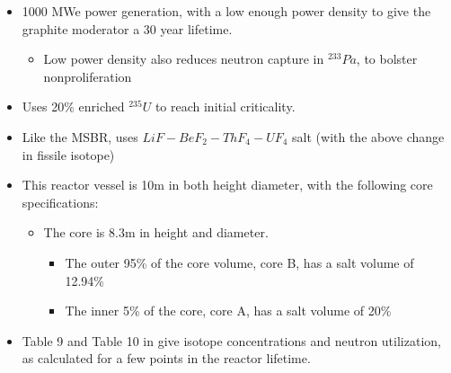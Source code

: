\documentclass[letterpaper]{article}
\begin{document}
\begin{itemize}
\item 1000 MWe power generation, with a low enough power density to give the graphite moderator a 30 year lifetime.
	\begin{itemize}
	\item Low power density also reduces neutron capture in ${}^{233}Pa$, to bolster nonproliferation
	\end{itemize}
\item Uses 20\% enriched ${}^{235}U$ to reach initial criticality.
\item Like the MSBR, uses $LiF - BeF_2 - ThF_4 - UF_4$ salt (with the above change in fissile isotope)
\item This reactor vessel is 10m in both height diameter, with the following core specifications:
	\begin{itemize}
	\item The core is 8.3m in height and diameter.
		\begin{itemize}
		\item The outer 95\% of the core volume, core B, has a salt volume of 12.94\%
		\item The inner 5\% of the core, core A, has a salt volume of 20\%
		\end{itemize}
	\end{itemize}
\item Table 9 and Table 10 in \cite{engel_conceptual_1980} give isotope concentrations and neutron utilization, as calculated for a few points in the reactor lifetime.
\end{itemize}
\end{document}
